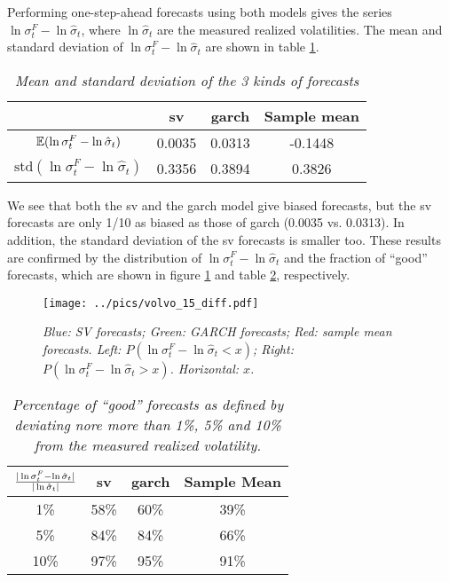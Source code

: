 Performing one-step-ahead forecasts using both models gives the series
$\ln\sigma^F_t - \ln\hat{\sigma}_t$, where $\ln\hat{\sigma}_t$ are the
measured realized volatilities. The mean and standard deviation of
$\ln\sigma^F_t - \ln\hat{\sigma}_t$ are shown in table
\ref{tab:volvo_15_stat}.
\begin{table}[htb!]
  \centering
  \begin{tabular}{|c|c|c|c|}
    \hline
     & \gls{sv} & \gls{garch} & Sample mean \\
     \hline
    $\mathbb{E}(\ln \sigma^F_t - \ln \hat{\sigma}_t)$ & 0.0035 & 0.0313 & -0.1448 \\
    \hline
     $\text{std}(\ln \sigma^F_t - \ln \hat{\sigma}_t)$ & 0.3356 &
     0.3894 & 0.3826 \\
    \hline
 \end{tabular}
  \caption{\small \it Mean and standard deviation of the 3 kinds of
    forecasts}
  \label{tab:volvo_15_stat}
\end{table}
We see that both the \gls{sv} and the \gls{garch} model give biased forecasts, but
the \gls{sv} forecasts are only 1/10 as biased as those of \gls{garch} (0.0035
vs. 0.0313). In addition, the standard deviation of the \gls{sv} forecasts
is smaller too. These results are confirmed by the distribution of
$\ln \sigma^F_t - \ln \hat{\sigma}_t$ and the fraction of ``good''
forecasts, which are shown in figure \ref{fig:volvo_15_diff} and table
\ref{tab:volvo_15_diff}, respectively.
\begin{figure}[htb!]
  \centering
    \texttt{[image: ../pics/volvo\_15\_diff.pdf]}
  \caption{\small \it Blue: SV forecasts; Green: GARCH forecasts; Red:
    sample mean forecasts. Left: $P(\ln \sigma^F_t - \ln \hat{\sigma}_t < x)$;
    Right: $P(\ln \sigma^F_t - \ln \hat{\sigma}_t > x)$. Horizontal: $x$.}
  \label{fig:volvo_15_diff}
\end{figure}
\begin{table}[htb!]
  \centering
  \begin{tabular}{|c|c|c|c|}
    \hline
    ${|\ln \sigma^F_t - \ln \hat{\sigma}_t| \over |\ln
      \hat{\sigma}_t|}$ &
    \gls{sv} & \gls{garch} & Sample Mean \\
    \hline
    1\% & 58\% & 60\% & 39\% \\
    \hline
    5\% & 84\% & 84\% & 66\% \\
    \hline
    10\% & 97\% & 95\% & 91\% \\
    \hline
  \end{tabular}
  \caption{\small \it Percentage of ``good'' forecasts as defined by
    deviating nore more than 1\%, 5\% and 10\% from the measured
    realized volatility.}
  \label{tab:volvo_15_diff}
\end{table}


